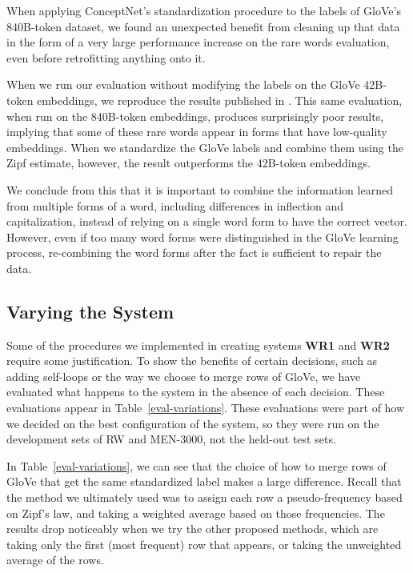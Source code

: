 \documentclass[11pt]{article}
\begin{document}
When applying ConceptNet's standardization procedure to the labels of GloVe's
840B-token dataset, we found an unexpected benefit from cleaning up that data in
the form of a very large performance increase on the rare words evaluation,
even before retrofitting anything onto it.

When we run our evaluation without modifying the labels on the GloVe 42B-token
embeddings, we reproduce the results published in \cite{pennington2014glove}.
This same evaluation, when run on the 840B-token embeddings, produces
surprisingly poor results, implying that some of these rare words appear in
forms that have low-quality embeddings. When we standardize the GloVe labels and
combine them using the Zipf estimate, however, the result outperforms the
42B-token embeddings.

We conclude from this that it is important to combine the information learned
from multiple forms of a word, including differences in inflection and
capitalization, instead of relying on a single word form to have the correct
vector. However, even if too many word forms were distinguished in the GloVe
learning process, re-combining the word forms after the fact is sufficient to
repair the data.

\subsection{Varying the System}

Some of the procedures we implemented in creating systems {\bf WR1} and
{\bf WR2} require some justification. To show the benefits of certain decisions,
such as adding self-loops or the way we choose to merge rows of GloVe, we have
evaluated what happens to the system in the absence of each decision. These
evaluations appear in Table~\ref{eval-variations}. These evaluations were
part of how we decided on the best configuration of the system, so they were
run on the development sets of RW and MEN-3000, not the held-out test sets.

In Table~\ref{eval-variations}, we can see that the choice of how to merge rows
of GloVe that get the same standardized label makes a large difference.  Recall
that the method we ultimately used was to assign each row a pseudo-frequency
based on Zipf's law, and taking a weighted average based on those frequencies.
The results drop noticeably when we try the other proposed methods, which are
taking only the first (most frequent) row that appears, or taking the
unweighted average of the rows.
\end{document}
